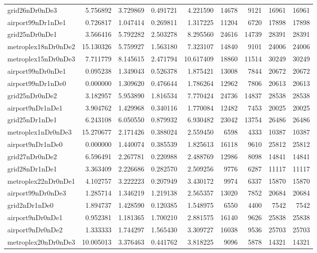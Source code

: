 \begin{longtable}{|l|r|r|r|r|r|r|r|r|}
grid26nDr0nDe3 & 5.756892 & 3.729869 & 0.491721 & 4.221590 & 14678 & 9121 & 16961 & 16961 \\
airport99nDr1nDe1 & 0.726817 & 1.047414 & 0.269811 & 1.317225 & 11204 & 6720 & 17898 & 17898 \\
grid25nDr0nDe1 & 3.566416 & 5.792282 & 2.503278 & 8.295560 & 24616 & 14739 & 28391 & 28391 \\
metroplex18nDr0nDe2 & 15.130326 & 5.759927 & 1.563180 & 7.323107 & 14840 & 9101 & 24006 & 24006 \\
metroplex15nDr0nDe3 & 7.711779 & 8.145615 & 2.471794 & 10.617409 & 18860 & 11514 & 30249 & 30249 \\
airport99nDr0nDe1 & 0.095238 & 1.349043 & 0.526378 & 1.875421 & 13008 & 7844 & 20672 & 20672 \\
airport99nDr1nDe0 & 0.000000 & 1.309620 & 0.476644 & 1.786264 & 12962 & 7806 & 20613 & 20613 \\
grid25nDr0nDe2 & 3.182957 & 5.953890 & 1.816534 & 7.770424 & 24736 & 14837 & 28538 & 28538 \\
airport9nDr1nDe1 & 3.904762 & 1.429968 & 0.340116 & 1.770084 & 12482 & 7453 & 20025 & 20025 \\
grid25nDr1nDe1 & 6.243108 & 6.050550 & 0.879932 & 6.930482 & 23042 & 13754 & 26486 & 26486 \\
metroplex1nDr0nDe3 & 15.270677 & 2.171426 & 0.388024 & 2.559450 & 6598 & 4333 & 10387 & 10387 \\
airport9nDr1nDe0 & 0.000000 & 1.440074 & 0.385539 & 1.825613 & 16118 & 9610 & 25812 & 25812 \\
grid27nDr0nDe2 & 6.596491 & 2.267781 & 0.220988 & 2.488769 & 12986 & 8098 & 14841 & 14841 \\
grid28nDr1nDe1 & 3.363409 & 2.226686 & 0.282570 & 2.509256 & 9776 & 6287 & 11117 & 11117 \\
metroplex22nDr0nDe1 & 4.102757 & 3.222223 & 0.207949 & 3.430172 & 9974 & 6337 & 15870 & 15870 \\
airport99nDr0nDe3 & 1.285714 & 1.346219 & 1.219138 & 2.565357 & 13020 & 7852 & 20684 & 20684 \\
grid2nDr1nDe0 & 1.894737 & 1.428590 & 0.120385 & 1.548975 & 6550 & 4400 & 7542 & 7542 \\
airport9nDr0nDe1 & 0.952381 & 1.181365 & 1.700210 & 2.881575 & 16140 & 9626 & 25838 & 25838 \\
airport9nDr0nDe2 & 1.333333 & 1.744297 & 1.565430 & 3.309727 & 16038 & 9536 & 25703 & 25703 \\
metroplex20nDr0nDe3 & 10.005013 & 3.376463 & 0.441762 & 3.818225 & 9096 & 5878 & 14321 & 14321 \\

\end{longtable}
